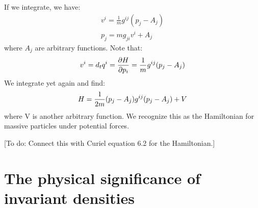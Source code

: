 \documentclass[letterpaper]{article}
\begin{document}
If we integrate, we have:
\begin{equation} 
\begin{aligned}
v^i = \frac{1}{m} g^{ij}(p_j - A_j) \\
p_j = m g_{ji} v^i + A_j
\end{aligned}
\end{equation}
where $A_j$ are arbitrary functions. Note that:
\begin{equation}
v^i = d_t q^i = \frac{\partial H }{\partial p_i} = \frac{1}{m} g^{ij}(p_j - A_j) \\
\end{equation}
We integrate yet again and find:
\begin{equation} \label{massive_Hamiltonian}
H = \frac{1}{2m} (p_j - A_j) g^{ij}(p_j - A_j) + V \\
\end{equation}
where V is another arbitrary function. We recognize this as the Hamiltonian for massive particles under potential forces.

[To do: Connect this with Curiel equation 6.2 for the Hamiltonian.]





\section{The physical significance of invariant densities}
\label{density}
\end{document}
